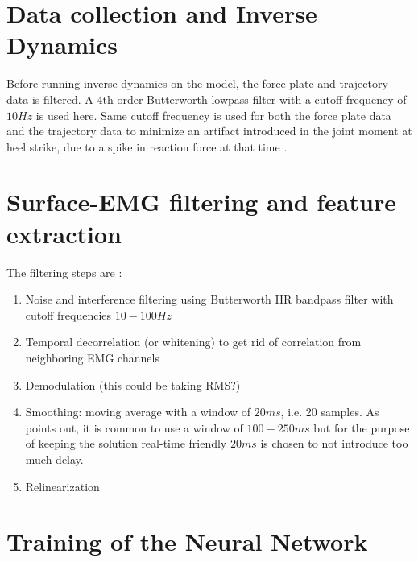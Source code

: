 \documentclass[../main.tex]{subfiles}
\begin{document}


\section{Data collection and Inverse Dynamics}
Before running inverse dynamics on the model, the force plate and trajectory data is filtered. A 4th order Butterworth lowpass filter with a cutoff frequency of $10Hz$ is used here. Same cutoff frequency is used for both the force plate data and the trajectory data to minimize an artifact introduced in the joint moment at heel strike, due to a spike in reaction force at that time \cite{Kristianslund2012}.

\section{Surface-EMG filtering and feature extraction}
The filtering steps are \parencite[99]{Clancy2016}:
\begin{enumerate}
    \item Noise and interference filtering using Butterworth IIR bandpass filter with cutoff frequencies $10-100Hz$
    \item Temporal decorrelation (or whitening) to get rid of correlation from neighboring EMG channels
    \item Demodulation (this could be taking RMS?)
    \item Smoothing: moving average with a window of $20ms$, i.e. 20 samples. As \citeauthor{Clancy2016} points out, it is common to use a window of $100-250 ms$ but for the purpose of keeping the solution real-time friendly $20ms$ is chosen to not introduce too much delay.
    \item Relinearization
\end{enumerate}

\section{Training of the Neural Network}
\end{document}
